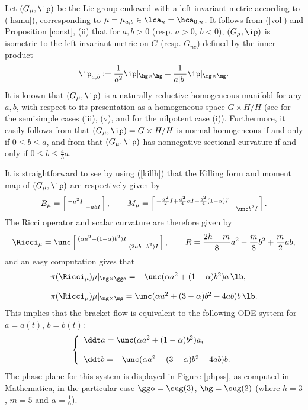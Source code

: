 \documentclass[11pt]{amsart}
\theoremstyle{plain}
\theoremstyle{definition}
\theoremstyle{remark}
\begin{document}
Let $(G_\mu,\ip)$ be the Lie group endowed with a left-invariant metric according to (\ref{hsmu}), corresponding to $\mu=\mu_{a,b}\in\lca_n=\hca_{0,n}$.  It follows from (\ref{vol}) and Proposition \ref{const}, (ii) that for $a,b>0$ (resp. $a>0$, $b<0$), $(G_\mu,\ip)$ is isometric to the left invariant metric on $G$ (resp. $G_{nc}$) defined by the inner product
$$
\ip_{a,b}:=\frac{1}{a^2}\ip|_{\hg\times\hg} + \frac{1}{a|b|}\ip|_{\mg\times\mg}.
$$
It is known that $(G_\mu,\ip)$ is a naturally reductive homogeneous manifold for any $a,b$, with respect to its presentation as a homogeneous space $G\times H/H$ (see \cite[Theorem 1]{DtrZll} for the semisimple cases (iii), (v), and \cite{manus} for the nilpotent case (i)).  Furthermore, it easily follows from \cite[Theorem 3]{DtrZll} that $(G_\mu,\ip)=G\times H/H$ is normal homogeneous if and only if $0\leq b\leq a$, and from \cite[Theorem 9]{DtrZll} that $(G_\mu,\ip)$ has nonnegative sectional curvature if and only if $0\leq b\leq \frac{4}{3}a$.

It is straightforward to see by using (\ref{killh}) that the Killing form and moment map of $(G_\mu,\ip)$ are respectively given by
$$
B_\mu=\left[\begin{smallmatrix} -a^2I&\\ &-abI \end{smallmatrix}\right], \qquad
M_\mu=\left[\begin{smallmatrix} -\frac{a^2}{2}I+\frac{a^2}{4}\alpha I+\frac{b^2}{4}(1-\alpha)I&\\ &-\unc b^2I \end{smallmatrix}\right].
$$
The Ricci operator and scalar curvature are therefore given by
$$
\Ricci_\mu=\unc\left[\begin{smallmatrix} (\alpha a^2+(1-\alpha)b^2)I&\\ &(2ab-b^2)I \end{smallmatrix}\right],  \qquad R=\frac{2h-m}{8}a^2-\frac{m}{8}b^2+\frac{m}{2}ab,
$$
and an easy computation gives that
$$
\begin{array}{l}
\pi(\Ricci_\mu)\mu|_{\hg\times\ggo}=-\unc (\alpha a^2+(1-\alpha)b^2)a\, \lb, \\ \\
\pi(\Ricci_\mu)\mu|_{\mg\times\mg}=\unc (\alpha a^2+(3-\alpha)b^2-4ab)b\, \lb.
\end{array}
$$
This implies that the bracket flow is equivalent to the following ODE system for $a=a(t)$, $b=b(t)$:
\begin{equation}\label{bfexss}
\left\{\begin{array}{l}
\ddt a = \unc (\alpha a^2+(1-\alpha)b^2)a, \\ \\
\ddt b = -\unc (\alpha a^2+(3-\alpha)b^2-4ab)b.
\end{array}\right.
\end{equation}
The phase plane for this system is displayed in Figure \ref{phpss}, as computed in Mathematica, in the particular case $\ggo=\sug(3)$, $\hg=\sug(2)$ (where $h=3$, $m=5$ and $\alpha=\frac{1}{6}$).
\end{document}

